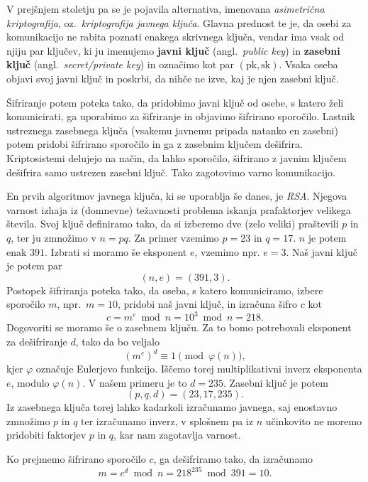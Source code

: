 \documentclass[isrm2, tisk]{fmfdelo}
\begin{document}
V prejšnjem stoletju pa se je pojavila alternativa, imenovana \textit{asimetrična kriptografija}, oz.\
\textit{kriptografija javnega ključa}. Glavna prednost te je, da osebi za komunikacijo ne rabita 
poznati enakega skrivnega ključa, vendar ima vsak od njiju par ključev, ki ju imenujemo \textbf{javni 
ključ} (angl.\ \textit{public key}) in \textbf{zasebni ključ} (angl.\ \textit{secret/private key}) in 
označimo kot par $(\text{pk}, \text{sk})$. Vsaka oseba objavi svoj javni ključ in poskrbi, da nihče 
ne izve, kaj je njen zasebni ključ. 

Šifriranje potem poteka tako, da pridobimo javni ključ od osebe, s katero želi komunicirati, ga uporabimo
za šifriranje in objavimo šifrirano sporočilo. Lastnik ustreznega zasebnega ključa (vsakemu javnemu pripada 
natanko en zasebni) potem pridobi šifrirano sporočilo in ga z zasebnim ključem dešifrira. Kriptosistemi
delujejo na način, da lahko sporočilo, šifrirano z javnim ključem dešifrira samo ustrezen zasebni ključ.
Tako zagotovimo varno komunikacijo. 

\begin{primer}[RSA]
\label{primer:rsa}
    En prvih algoritmov javnega ključa, ki se uporablja še danes, je \textit{RSA}. Njegova varnost izhaja 
    iz (domnevne) težavnosti problema iskanja prafaktorjev velikega števila. Svoj ključ definiramo tako, 
    da si izberemo dve (zelo veliki) praštevili $p$ in $q$, ter ju zmnožimo v $n = pq$. Za primer vzemimo 
    $p = 23$ in  $q = 17$. $n$ je potem enak $391$. Izbrati si moramo še eksponent $e$, vzemimo npr. $e = 3$. 
    Naš javni ključ je potem par 
    $$ 
    (n, e) = (391, 3).
    $$
    Postopek šifriranja poteka tako, da oseba, s katero komuniciramo, izbere sporočilo $m$, npr.\ 
    $m = 10$, pridobi naš javni ključ, in izračuna šifro $c$ kot
    $$
    c = m^e \bmod{n} = 10^3 \bmod{n} = 218.
    $$
    Dogovoriti se moramo še o zasebnem ključu. Za to bomo potrebovali eksponent za dešifriranje $d$,
    tako da bo veljalo 
    $$
    (m^e)^d \equiv 1 \pmod{\varphi(n)},
    $$ 
    kjer $\varphi$ označuje Eulerjevo funkcijo. Iščemo torej multiplikativni inverz eksponenta 
    $e$, modulo $\varphi(n)$. V našem primeru je to $d = 235$. Zasebni ključ je potem 
    $$ 
    (p, q, d) = (23, 17, 235). 
    $$
    Iz zasebnega ključa torej lahko kadarkoli izračunamo javnega, saj enostavno zmnožimo $p$ in $q$ 
    ter izračunamo inverz, v splošnem pa iz $n$ učinkovito ne moremo pridobiti faktorjev $p$ in $q$,
    kar nam zagotavlja varnost.

    Ko prejmemo šifrirano sporočilo $c$, ga dešifriramo tako, da izračunamo
    $$
    m = c^d \bmod{n} = 218^{235} \bmod{391} = 10.   
    $$
\end{primer}
\end{document}
